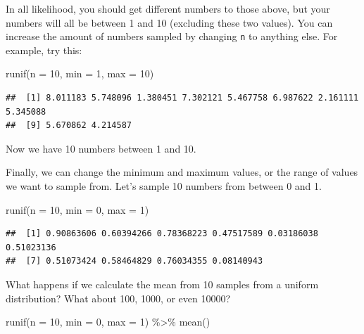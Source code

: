 \documentclass[
]{book}
\newenvironment{Shaded}{\begin{snugshade}}{\end{snugshade}}
\newcommand{\AttributeTok}[1]{\textcolor[rgb]{0.77,0.63,0.00}{#1}}
\newcommand{\DecValTok}[1]{\textcolor[rgb]{0.00,0.00,0.81}{#1}}
\newcommand{\FunctionTok}[1]{\textcolor[rgb]{0.00,0.00,0.00}{#1}}
\newcommand{\NormalTok}[1]{#1}
\newcommand{\SpecialCharTok}[1]{\textcolor[rgb]{0.00,0.00,0.00}{#1}}
\begin{document}
In all likelihood, you should get different numbers to those above, but your numbers will all be between 1 and 10 (excluding these two values). You can increase the amount of numbers sampled by changing \texttt{n} to anything else. For example, try this:

\begin{Shaded}
\begin{Highlighting}[]
\FunctionTok{runif}\NormalTok{(}\AttributeTok{n =} \DecValTok{10}\NormalTok{, }\AttributeTok{min =} \DecValTok{1}\NormalTok{, }\AttributeTok{max =} \DecValTok{10}\NormalTok{)}
\end{Highlighting}
\end{Shaded}

\begin{verbatim}
##  [1] 8.011183 5.748096 1.380451 7.302121 5.467758 6.987622 2.161111 5.345088
##  [9] 5.670862 4.214587
\end{verbatim}

Now we have 10 numbers between 1 and 10.

Finally, we can change the minimum and maximum values, or the range of values we want to sample from. Let's sample 10 numbers from between 0 and 1.

\begin{Shaded}
\begin{Highlighting}[]
\FunctionTok{runif}\NormalTok{(}\AttributeTok{n =} \DecValTok{10}\NormalTok{, }\AttributeTok{min =} \DecValTok{0}\NormalTok{, }\AttributeTok{max =} \DecValTok{1}\NormalTok{)}
\end{Highlighting}
\end{Shaded}

\begin{verbatim}
##  [1] 0.90863606 0.60394266 0.78368223 0.47517589 0.03186038 0.51023136
##  [7] 0.51073424 0.58464829 0.76034355 0.08140943
\end{verbatim}

What happens if we calculate the mean from 10 samples from a uniform distribution? What about 100, 1000, or even 10000?

\begin{Shaded}
\begin{Highlighting}[]
\FunctionTok{runif}\NormalTok{(}\AttributeTok{n =} \DecValTok{10}\NormalTok{, }\AttributeTok{min =} \DecValTok{0}\NormalTok{, }\AttributeTok{max =} \DecValTok{1}\NormalTok{) }\SpecialCharTok{\%\textgreater{}\%} \FunctionTok{mean}\NormalTok{()}
\end{Highlighting}
\end{Shaded}
\end{document}
